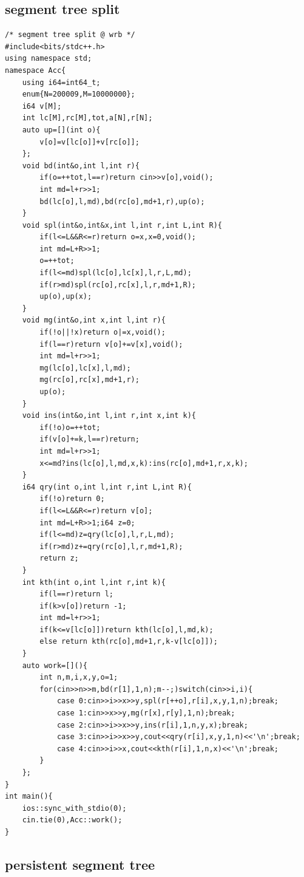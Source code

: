 \documentclass[UTF8, a4paper, titlepage, twoside]{ctexart}
\begin{document}
\subsection{ segment tree split }
\begin{lstlisting}[style=cpp]
/* segment tree split @ wrb */
#include<bits/stdc++.h>
using namespace std;
namespace Acc{
    using i64=int64_t;
    enum{N=200009,M=10000000};
    i64 v[M];
    int lc[M],rc[M],tot,a[N],r[N];
    auto up=[](int o){
        v[o]=v[lc[o]]+v[rc[o]];
    };
    void bd(int&o,int l,int r){
        if(o=++tot,l==r)return cin>>v[o],void();
        int md=l+r>>1;
        bd(lc[o],l,md),bd(rc[o],md+1,r),up(o);
    }
    void spl(int&o,int&x,int l,int r,int L,int R){
        if(l<=L&&R<=r)return o=x,x=0,void();
        int md=L+R>>1;
        o=++tot;
        if(l<=md)spl(lc[o],lc[x],l,r,L,md);
        if(r>md)spl(rc[o],rc[x],l,r,md+1,R);
        up(o),up(x);
    }
    void mg(int&o,int x,int l,int r){
        if(!o||!x)return o|=x,void();
        if(l==r)return v[o]+=v[x],void();
        int md=l+r>>1;
        mg(lc[o],lc[x],l,md);
        mg(rc[o],rc[x],md+1,r);
        up(o);
    }
    void ins(int&o,int l,int r,int x,int k){
        if(!o)o=++tot;
        if(v[o]+=k,l==r)return;
        int md=l+r>>1;
        x<=md?ins(lc[o],l,md,x,k):ins(rc[o],md+1,r,x,k);
    }
    i64 qry(int o,int l,int r,int L,int R){
        if(!o)return 0;
        if(l<=L&&R<=r)return v[o];
        int md=L+R>>1;i64 z=0;
        if(l<=md)z=qry(lc[o],l,r,L,md);
        if(r>md)z+=qry(rc[o],l,r,md+1,R);
        return z;
    }
    int kth(int o,int l,int r,int k){
        if(l==r)return l;
        if(k>v[o])return -1;
        int md=l+r>>1;
        if(k<=v[lc[o]])return kth(lc[o],l,md,k);
        else return kth(rc[o],md+1,r,k-v[lc[o]]);
    }
    auto work=[](){
        int n,m,i,x,y,o=1;
        for(cin>>n>>m,bd(r[1],1,n);m--;)switch(cin>>i,i){
            case 0:cin>>i>>x>>y,spl(r[++o],r[i],x,y,1,n);break;
            case 1:cin>>x>>y,mg(r[x],r[y],1,n);break;
            case 2:cin>>i>>x>>y,ins(r[i],1,n,y,x);break;
            case 3:cin>>i>>x>>y,cout<<qry(r[i],x,y,1,n)<<'\n';break;
            case 4:cin>>i>>x,cout<<kth(r[i],1,n,x)<<'\n';break;
        }
    };
}
int main(){
    ios::sync_with_stdio(0);
    cin.tie(0),Acc::work();
}
\end{lstlisting}

\subsection{ persistent segment tree }
\end{document}
